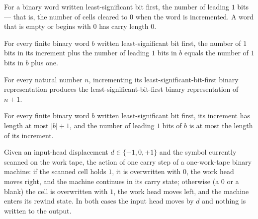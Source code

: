 \begin{definition}
\label{Complexity.counterCarry}
\leanok
For a binary word written least-significant bit first, the number of leading
$1$ bits — that is, the number of cells cleared to $0$ when the word is
incremented. A word that is empty or begins with $0$ has carry length $0$.
\end{definition}

\begin{lemma}
\label{Complexity.counterInc_potential}
\leanok
{}
For every finite binary word $b$ written least-significant bit first, the number of $1$
bits in its increment plus the number of leading $1$ bits in $b$ equals the number of
$1$ bits in $b$ plus one.
\end{lemma}

\begin{lemma}
\label{Complexity.counterInc_bits}
\leanok
{}
For every natural number $n$, incrementing its least-significant-bit-first binary
representation produces the least-significant-bit-first binary representation of $n+1$.
\end{lemma}

\begin{lemma}
\label{Complexity.counterInc_length}
\leanok
{}
For every finite binary word $b$ written least-significant bit first, its increment has
length at most $|b|+1$, and the number of leading $1$ bits of $b$ is at most the length
of its increment.
\end{lemma}

\begin{definition}
\label{Complexity.counterBump}
\leanok
{}
Given an input-head displacement $d \in \{-1, 0, +1\}$ and the symbol currently
scanned on the work tape, the action of one carry step of a one-work-tape
binary machine: if the scanned cell holds $1$, it is overwritten with $0$, the
work head moves right, and the machine continues in its carry state; otherwise
(a $0$ or a blank) the cell is overwritten with $1$, the work head moves left,
and the machine enters its rewind state. In both cases the input head moves by
$d$ and nothing is written to the output.
\end{definition}


